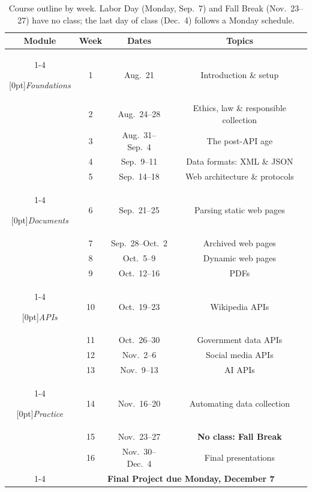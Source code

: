 \documentclass[11pt]{memoir}
\begin{document}
\begin{table}[ht]
\centering
    \begin{tabular}{cccc}
        \toprule[.15em]
        \textbf{Module} & \textbf{Week} & \textbf{Dates} & \textbf{Topics} \\
        \cmidrule[.1em](lr){1-4}

        \multirow{5}{*}[0pt]{\textit{Foundations}}
            & 1 & Aug.~21 & Introduction \& setup \\
            & 2 & Aug.~24--28 & Ethics, law \& responsible collection \\
            & 3 & Aug.~31--Sep.~4 & The post-API age \\
            & 4 & Sep.~9--11 & Data formats: XML \& JSON \\
            & 5 & Sep.~14--18 & Web architecture \& protocols \\ \cmidrule[.1em](lr){1-4}

        \multirow{4}{*}[0pt]{\textit{Documents}}
            & 6 & Sep.~21--25 & Parsing static web pages \\
            & 7 & Sep.~28--Oct.~2 & Archived web pages \\
            & 8 & Oct.~5--9 & Dynamic web pages \\
            & 9 & Oct.~12--16 & PDFs \\ \cmidrule[.1em](lr){1-4}

        \multirow{4}{*}[0pt]{\textit{APIs}}
            & 10 & Oct.~19--23 & Wikipedia APIs \\
            & 11 & Oct.~26--30 & Government data APIs \\
            & 12 & Nov.~2--6 & Social media APIs \\
            & 13 & Nov.~9--13 & AI APIs \\ \cmidrule[.1em](lr){1-4}

        \multirow{3}{*}[0pt]{\textit{Practice}}
            & 14 & Nov.~16--20 & Automating data collection \\
            & 15 & Nov.~23--27 & \textbf{No class: Fall Break} \\
            & 16 & Nov.~30--Dec.~4 & Final presentations \\
            \cmidrule[.1em](lr){1-4}
            & \multicolumn{3}{c}{\textbf{Final Project due Monday, December 7}} \\

        \bottomrule[.15em]
    \end{tabular}
    \caption{Course outline by week. Labor Day (Monday, Sep.~7) and Fall Break (Nov.~23--27) have no class; the last day of class (Dec.~4) follows a Monday schedule.}
    \label{tab:course_outline}
\end{table}
\end{document}
